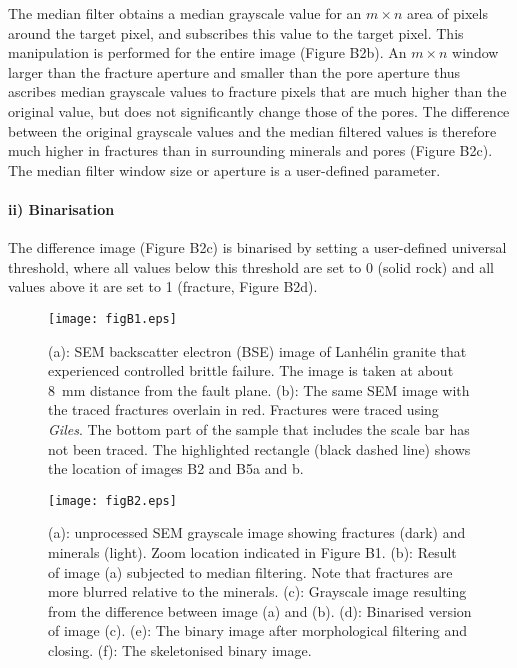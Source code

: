 \documentclass{article}
\begin{document}
\begin{multicols}{2}
The median filter obtains a median grayscale value for an $m \times n$ area of pixels around the target pixel, and subscribes this value to the target pixel. This manipulation is performed for the entire image (Figure B2b). An $m \times n$ window larger than the fracture aperture and smaller than the pore aperture thus ascribes median grayscale values to fracture pixels that are much higher than the original value, but does not significantly change those of the pores. The difference between the original grayscale values and the median filtered values is therefore much higher in fractures than in surrounding minerals and pores (Figure B2c). The median filter window size or aperture is a user-defined parameter. 

\paragraph{ii) Binarisation}
The difference image (Figure B2c) is binarised by setting a user-defined universal threshold, where all values below this threshold are set to 0 (solid rock) and all values above it are set to 1 (fracture, Figure B2d). 

\end{multicols}
\begin{figure*}[h]
\centering
\texttt{[image: figB1.eps]}
\caption{(a): SEM backscatter electron (BSE) image of Lanh\'elin granite that experienced controlled brittle failure. The image is taken at about 8~mm distance from the fault plane. (b): The same SEM image with the traced fractures overlain in red. Fractures were traced using \textit{Giles}. The bottom part of the sample that includes the scale bar has not been traced. The highlighted rectangle (black dashed line) shows the location of images B2 and B5a and b.}
\label{fig:B1}
\end{figure*} 
\FloatBarrier

\begin{figure*}
\centering
\texttt{[image: figB2.eps]}
\caption{(a): unprocessed SEM grayscale image showing fractures (dark) and minerals (light). Zoom location indicated in Figure B1. (b): Result of image (a) subjected to median filtering. Note that fractures are more blurred relative to the minerals. (c): Grayscale image resulting from the difference between image (a) and (b). (d): Binarised version of image (c). (e): The binary image after morphological filtering and closing. (f): The skeletonised binary image. }
\label{fig:B2}
\end{figure*} 
\end{document}
